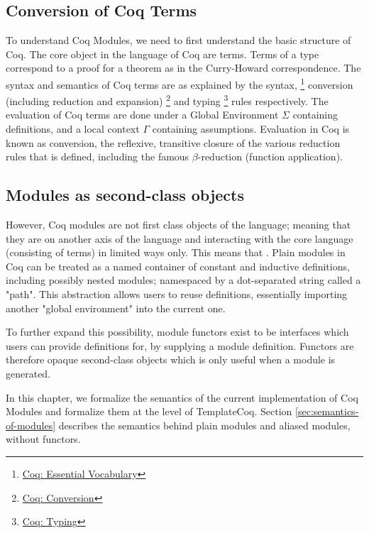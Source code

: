 \subsection{Conversion of Coq Terms}

To understand Coq Modules, we need to first understand the basic structure of
Coq. The core object in the language of Coq are terms. Terms of a type
correspond to a proof for a theorem as in the Curry-Howard correspondence.  The
syntax and semantics of Coq terms are as explained by the syntax,
\footnote{\href{https://coq.inria.fr/refman/language/core/basic.html\#essential-vocabulary}
{Coq: Essential Vocabulary}} conversion (including reduction and expansion)
\footnote{\href{https://coq.inria.fr/refman/language/core/conversion.html} {Coq:
Conversion}} and typing
\footnote{\href{https://coq.inria.fr/refman/language/cic.html} {Coq: Typing}}
rules respectively. The evaluation of Coq terms are done under a Global Environment
$\Sigma$ containing definitions, and a local context $\Gamma$ containing
assumptions. Evaluation in Coq is known as conversion, the reflexive, transitive
closure of the various reduction rules that is defined, including the famous
$\beta$-reduction (function application).

\subsection{Modules as second-class objects}
However, Coq modules are not first class objects of the language; meaning that
they are on another axis of the language and interacting with the core language
(consisting of terms) in limited ways only. This means that .
Plain modules in Coq can be treated as a named container of constant
and inductive definitions, including possibly nested modules; namespaced by a 
dot-separated string called a "path". This abstraction allows users to reuse
definitions, essentially importing another "global environment" into the current
one.

To further expand this possibility, module functors exist to be interfaces which
users can provide definitions for, by supplying a module definition. Functors
are therefore opaque second-class objects which is only useful when a module is
generated.

In this chapter, we formalize the semantics of the current implementation of Coq
Modules and formalize them at the level of TemplateCoq. Section
\ref{sec:semantics-of-modules} describes the semantics behind plain modules and
aliased modules, without functors.

